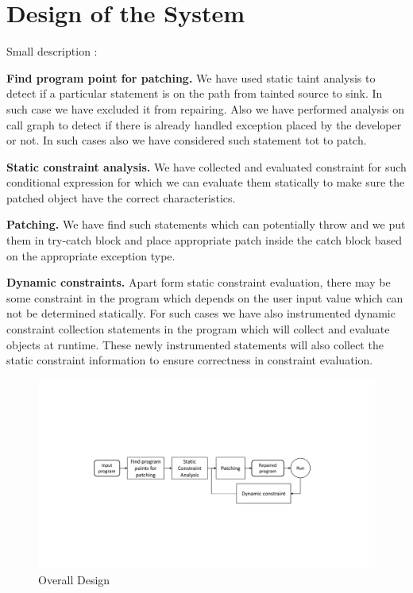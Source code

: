 \section{Design of the System}
\label{sec:design}

Small description :
\begin{mylist}
\item \textbf{Find program point for patching.} We have used static taint
analysis to detect if a particular statement is on the path from tainted source
to sink. In such case we have excluded it from repairing. Also we have performed
analysis on call graph to detect if there is already handled exception placed by
the developer or not. In such cases also we have considered such statement tot
to patch.

\item \textbf{Static constraint analysis.} We have collected and evaluated
constraint for such conditional expression for which we can evaluate them
statically to make sure the patched object have the correct characteristics.

\item \textbf{Patching.} We have find such statements which can potentially throw
 and we put them in try-catch block and place appropriate
patch inside the catch block based on the appropriate exception type.

\item \textbf{Dynamic constraints.} Apart form static constraint evaluation,
there may be some constraint in the program which depends on the user input
value which can not be determined statically. For such cases we have also
instrumented dynamic constraint collection statements in the program which will
collect and evaluate objects at runtime. These newly instrumented statements
will also collect the static constraint information to ensure correctness in
constraint evaluation.

\end{mylist}
\begin{figure}[t]
\centering
\includegraphics[scale=.38]{images/NewDesignDiagram.pdf}
\caption{Overall Design}
\label{fig:overallDesign}
\end{figure}


